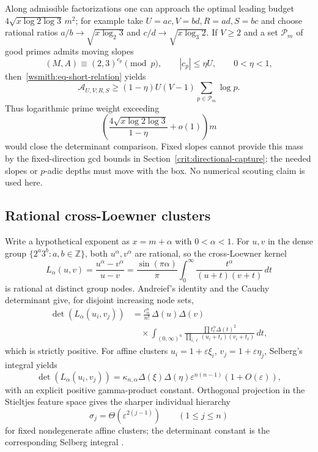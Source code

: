 \documentclass[11pt,oneside]{article}
\theoremstyle{definition}
\theoremstyle{remark}
\newcommand{\Z}{\mathbb Z}
\begin{document}
Along admissible factorizations one can approach the optimal leading budget
$4\sqrt{x\log2\log3}\,m^2$; for example take
$U=ac,V=bd,R=ad,S=bc$ and choose rational ratios
$a/b\to\sqrt{x\log_2 3}$ and
$c/d\to\sqrt{x\log_3 2}$.  If $V\ge2$ and a set $\mathcal P_m$ of good primes admits
moving slopes
\[
 (M,A)\equiv(2,3)^{c_p}\pmod p,\qquad |c_p|\le\eta U,\qquad0<\eta<1,
\]
then~\eqref{wsmith:eq-short-relation} yields
\[
 \mathcal A_{U,V;R,S}\ge
 (1-\eta)U(V-1)\sum_{p\in\mathcal P_m}\log p.
\]
Thus logarithmic prime weight exceeding
\[
 \left(\frac{4\sqrt{x\log2\log3}}{1-\eta}+o(1)\right)m
\]
would close the determinant comparison.  Fixed slopes cannot provide this mass by the
fixed-direction gcd bounds in Section~\ref{crit:directional-capture}; the needed slopes or
$p$-adic depths must move with the box.  No numerical scouting claim is used here.

\subsection{Rational cross-Loewner clusters}
\label{wsmith:loewner}

Write a hypothetical exponent as $x=m+\alpha$ with $0<\alpha<1$.  For
$u,v$ in the dense group $\{2^a3^b:a,b\in\Z\}$, both $u^\alpha,v^\alpha$ are rational, so the
cross-Loewner kernel
\begin{equation}
 L_\alpha(u,v)=\frac{u^\alpha-v^\alpha}{u-v}
 =\frac{\sin(\pi\alpha)}{\pi}
   \int_0^\infty\frac{t^\alpha}{(u+t)(v+t)}\,dt
 \label{wsmith:eq-loewner}
\end{equation}
is rational at distinct group nodes.  Andreief's identity and the Cauchy determinant give,
for disjoint increasing node sets,
\begin{align}
 \det(L_\alpha(u_i,v_j))
 &=\frac{c_\alpha^n}{n!}\,\Delta(u)\Delta(v)\\
 &\quad\times\int_{(0,\infty)^n}
 \frac{\prod t_\ell^\alpha\Delta(t)^2}
      {\prod_{i,\ell}(u_i+t_\ell)(v_i+t_\ell)}\,dt,
 \label{wsmith:eq-loewner-andreief}
\end{align}
which is strictly positive.  For affine clusters
$u_i=1+\varepsilon\xi_i$, $v_j=1+\varepsilon\eta_j$, Selberg's integral yields
\begin{equation}
 \det(L_\alpha(u_i,v_j))
 =\kappa_{n,\alpha}\Delta(\xi)\Delta(\eta)
   \varepsilon^{n(n-1)}(1+O(\varepsilon)),
 \label{wsmith:eq-loewner-cluster}
\end{equation}
with an explicit positive gamma-product constant.  Orthogonal projection in the Stieltjes
feature space gives the sharper individual hierarchy
\begin{equation}
 \sigma_j=\Theta(\varepsilon^{2(j-1)})\qquad(1\le j\le n)
 \label{wsmith:eq-loewner-singular}
\end{equation}
for fixed nondegenerate affine clusters; the determinant constant is the corresponding
Selberg integral \cite{Selberg1944}.
\end{document}
